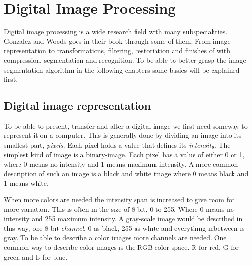 \section{Digital Image Processing}
Digital image processing is a wide research field with many subspecialities.
Gonzalez and Woods \cite{gonzalez2008} goes in their book through some of them.
From image representation to transformations, filtering, restoriation and finishes
of with compression, segmentation and recognition. To be able to better grasp
the image segmentation algorithm in the following chapters some basics will be
explained first.

\subsection{Digital image representation}
To be able to present, transfer and alter a digital image we first need someway
to represent it on a computer. This is generally done by dividing an image into
its smallest part, {\em pixels}. Each pixel holds a value that defines its {\em intensity}.
The simplest kind of image is a binary-image. Each pixel has a value of either
0 or 1, where 0 means no intensity and 1 means maximum intensity. A more common
description of such an image is a black and white image where 0 means black and
1 means white.

When more colors are needed the intensity span is increased to give room for more
variation. This is often in the size of 8-bit, 0 to 255. Where 0 means no intensity
and 255 maximum intensity. A gray-scale image would be described in this way, one 8-bit
{\em channel}, 0 as black, 255 as white and everything inbetween is gray.
To be able to describe a color images more channels are needed. One common way
to describe color images is the RGB color space. R for red, G for green and B for
blue.

